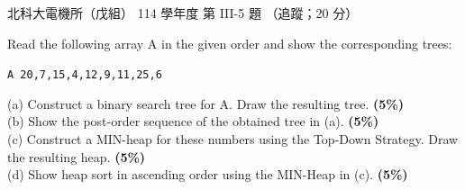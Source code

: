 \begin{pastexam}[label={px:ntut-114-ee-ds-13}]{北科大電機所（戊組） 114 學年度 第 III-5 題}
（追蹤；20 分）

Read the following array A in the given order and show the corresponding trees:
\begin{center}\texttt{A 20,7,15,4,12,9,11,25,6}\end{center}
(a) Construct a binary search tree for A. Draw the resulting tree. \textbf{(5\%)}\\
(b) Show the post-order sequence of the obtained tree in (a). \textbf{(5\%)}\\
(c) Construct a MIN-heap for these numbers using the Top-Down Strategy. Draw the resulting heap.
\textbf{(5\%)}\\
(d) Show heap sort in ascending order using the MIN-Heap in (c). \textbf{(5\%)}
\end{pastexam}

